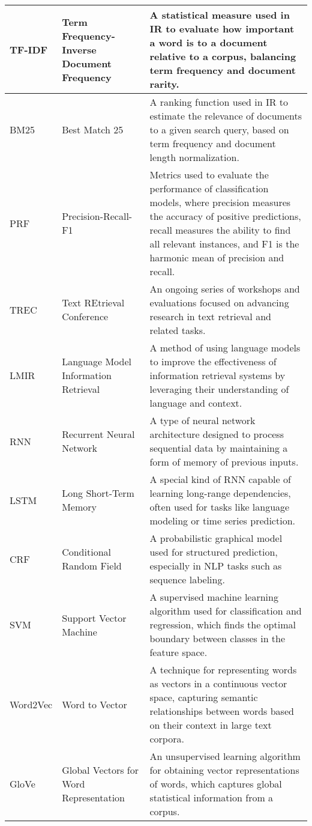 \begin{tabularx}{\textwidth}{
  >{\raggedright\arraybackslash}p{2.5cm}
  >{\raggedright\arraybackslash}p{4cm}
  >{\noindent\justifying\arraybackslash}X
}
\cmidrule(lr){1-3}
TF-IDF & Term Frequency-Inverse Document Frequency & A statistical measure used in IR to evaluate how important a word is to a document relative to a corpus, balancing term frequency and document rarity. \\
\cmidrule(lr){1-3}
BM25  & Best Match 25 & A ranking function used in IR to estimate the relevance of documents to a given search query, based on term frequency and document length normalization.\\
\cmidrule(lr){1-3}
PRF   & Precision-Recall-F1 & Metrics used to evaluate the performance of classification models, where precision measures the accuracy of positive predictions, recall measures the ability to find all relevant instances, and F1 is the harmonic mean of precision and recall. \\
\cmidrule(lr){1-3}
TREC  & Text REtrieval Conference & An ongoing series of workshops and evaluations focused on advancing research in text retrieval and related tasks. \\
\cmidrule(lr){1-3}
LMIR & Language Model Information Retrieval & A method of using language models to improve the effectiveness of information retrieval systems by leveraging their understanding of language and context. \\
\cmidrule(lr){1-3}
RNN   & Recurrent Neural Network & A type of neural network architecture designed to process sequential data by maintaining a form of memory of previous inputs. \\
\cmidrule(lr){1-3}
LSTM  & Long Short-Term Memory & A special kind of RNN capable of learning long-range dependencies, often used for tasks like language modeling or time series prediction. \\
\cmidrule(lr){1-3}
CRF   & Conditional Random Field & A probabilistic graphical model used for structured prediction, especially in NLP tasks such as sequence labeling. \\
\cmidrule(lr){1-3}
SVM   & Support Vector Machine & A supervised machine learning algorithm used for classification and regression, which finds the optimal boundary between classes in the feature space. \\
\cmidrule(lr){1-3}
Word2Vec & Word to Vector & A technique for representing words as vectors in a continuous vector space, capturing semantic relationships between words based on their context in large text corpora. \\
\cmidrule(lr){1-3}
GloVe  & Global Vectors for Word Representation & An unsupervised learning algorithm for obtaining vector representations of words, which captures global statistical information from a corpus. \\

\end{tabularx}
